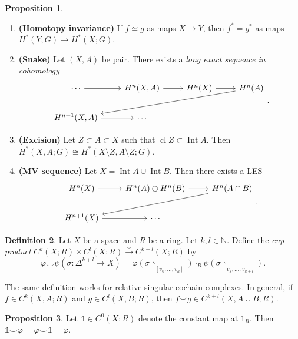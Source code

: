 \documentclass[10pt,letterpaper,cm]{nupset}
\theoremstyle{definition}
\newtheorem{definition}{Definition}[subsection]
\theoremstyle{theorem}
\newtheorem{prop}[definition]{Proposition}
\theoremstyle{remark}
\newcommand{\N}{\mathbb N}
\newcommand{\1}{\mathbb{1}}
\newcommand{\0}{\vec 0}
\DeclareMathOperator{\Int}{Int}
\DeclareMathOperator{\cl}{cl}
\begin{document}
\begin{prop} $ $
\begin{enumerate}
\item  {\textbf{(Homotopy invariance)}} If $f \simeq g$ as maps $X \to Y$, then $f^{\ast} = g^{\ast}$ as maps $H^{\ast}(Y; G) \to H^{\ast}(X; G)$.
\item {\textbf{(Snake)}} Let $\left(X, A\right)$ be pair. There exists a \textit{long exact sequence in cohomology}
\[
\begin{tikzcd}
\cdots \arrow[r]         & {H^n(X, A)} \arrow[r] & H^n(X) \arrow[r] & H^n(A) \arrow[llld] \\
{H^{n+1}(X,A)} \arrow[r] & \cdots                &                  &                    
\end{tikzcd}
.\]
\item {\textbf{(Excision)}} Let $Z \subset A \subset X$ such that $\cl{Z} \subset \Int{A}$. Then $H^{\ast}(X, A; G) \cong H^{\ast}(X \setminus Z, A \setminus Z; G)$.
\item {\textbf{(MV sequence)}} Let $X = \Int{A} \cup \Int{B}$. Then there exists a LES
\[
\begin{tikzcd}
H^n(X) \arrow[r]     & H^n(A) \oplus H^n(B) \arrow[r] & H^n(A \cap B) \arrow[lld] \\
H^{n+1}(X) \arrow[r] & \cdots                         &                          
\end{tikzcd}
.\]
\end{enumerate}
\end{prop}

\begin{definition}
Let $X$ be a space and $R$ be a ring. Let $k, l \in \N$. Define the \textit{cup product} $C^k(X; R) \times C^l(X; R) \overset{\smile}{\longrightarrow} C^{k+l}(X; R)$ by $$\varphi \smile \psi(\sigma: \Delta^{k+l} \to X) = \varphi(\sigma \restriction_{\left[v_0, \ldots, v_k\right]}) \cdot_R \psi(\sigma \restriction_{v_k, \ldots, v_{k+l}}).$$
\end{definition}


The same definition works for relative singular cochain complexes. In general, if $f\in C^k(X, A; R)$ and $g \in C^l(X, B; R)$, then $f\smile g  \in  C^{k+l}(X, A \cup B; R) .$


\begin{prop} 
Let $\1 \in C^0(X; R)$ denote the constant map at $1_R$. Then $\1 \smile \varphi = \varphi \smile \1 = \varphi$.
\end{prop}
\end{document}
